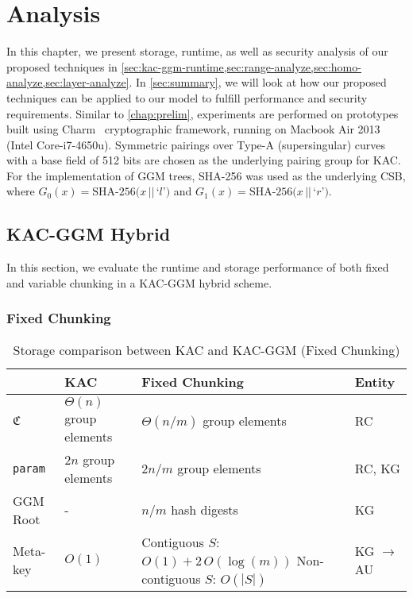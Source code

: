 \documentclass[hyp,a4paper,12pt,openbib]{socreport}
\begin{document}
\chapter{Analysis}
\label{chap:analysis}
In this chapter, we present storage, runtime, as well as security analysis of our proposed techniques in \cref{sec:kac-ggm-runtime,sec:range-analyze,sec:homo-analyze,sec:layer-analyze}. In \cref{sec:summary}, we will look at how our proposed techniques can be applied to our model to fulfill performance and security requirements. Similar to \cref{chap:prelim}, experiments are performed on prototypes built using Charm~\cite{charm13} cryptographic framework, running on Macbook Air 2013 (Intel Core-i7-4650u). Symmetric pairings over Type-A (supersingular) curves with a base field of 512 bits are chosen as the underlying pairing group for KAC. For the implementation of GGM trees, SHA-256 was used as the underlying CSB, where $G_0(x) = \text{SHA-256}(x \, || \, $`$l$'$)$ and $G_1(x) = \text{SHA-256}(x \, || \, $`$r$'$)$. 

\section{KAC-GGM Hybrid}
\label{sec:kac-ggm-runtime}
In this section, we evaluate the runtime and storage performance of both fixed and variable chunking in a KAC-GGM hybrid scheme.

\subsection{Fixed Chunking}

\begin{table}[h]
    \begin{tabular}{|l|l| p{} | l |}
  \hline
    ~              & KAC                        & Fixed Chunking                                                               & Entity   \\ \hline
    $\mathfrak{C}$    & $\Theta(n)$ group elements & $\Theta(n/m)$ group elements                                           & RC       \\ \hline
    \texttt{param} & $2n$ group elements        & $2n/m$ group elements                                                  & RC, KG   \\ \hline
    GGM Root       & -                          & $n/m$ hash digests                                                     & KG       \\ \hline
    Meta-key       & $O(1)$                     & Contiguous $S$: $O(1) + 2\,O(\log(m))$ \newline Non-contiguous $S$: $O(|S|)$ & KG $\to$ AU \\ \hline
    \end{tabular}
    \caption{Storage comparison between KAC and KAC-GGM (Fixed Chunking)}
    \label{tab:kac-ggm-storage}
\end{table}
\end{document}

